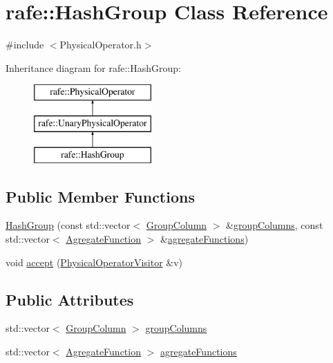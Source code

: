 \hypertarget{classrafe_1_1_hash_group}{\section{rafe\+:\+:Hash\+Group Class Reference}
\label{classrafe_1_1_hash_group}
}


{\ttfamily \#include $<$Physical\+Operator.\+h$>$}

Inheritance diagram for rafe\+:\+:Hash\+Group\+:\begin{figure}[H]
\begin{center}
\leavevmode
\includegraphics[height=3.000000cm]{classrafe_1_1_hash_group}
\end{center}
\end{figure}
\subsection*{Public Member Functions}
\begin{DoxyCompactItemize}
\item 
\hyperlink{classrafe_1_1_hash_group_af175c50e75d33c109d3c2413501932b1}{Hash\+Group} (const std\+::vector$<$ \hyperlink{classrafe_1_1_group_column}{Group\+Column} $>$ \&\hyperlink{classrafe_1_1_hash_group_a440af6cd151c376aefb5385bbac54cb8}{group\+Columns}, const std\+::vector$<$ \hyperlink{classrafe_1_1_agregate_function}{Agregate\+Function} $>$ \&\hyperlink{classrafe_1_1_hash_group_a26ed49743b63ae86b803e9fe725e72c1}{agregate\+Functions})
\item 
void \hyperlink{classrafe_1_1_hash_group_a91335ef36a07f6ab099785073e16786b}{accept} (\hyperlink{classrafe_1_1_physical_operator_visitor}{Physical\+Operator\+Visitor} \&v)
\end{DoxyCompactItemize}
\subsection*{Public Attributes}
\begin{DoxyCompactItemize}
\item 
std\+::vector$<$ \hyperlink{classrafe_1_1_group_column}{Group\+Column} $>$ \hyperlink{classrafe_1_1_hash_group_a440af6cd151c376aefb5385bbac54cb8}{group\+Columns}
\item 
std\+::vector$<$ \hyperlink{classrafe_1_1_agregate_function}{Agregate\+Function} $>$ \hyperlink{classrafe_1_1_hash_group_a26ed49743b63ae86b803e9fe725e72c1}{agregate\+Functions}
\end{DoxyCompactItemize}


